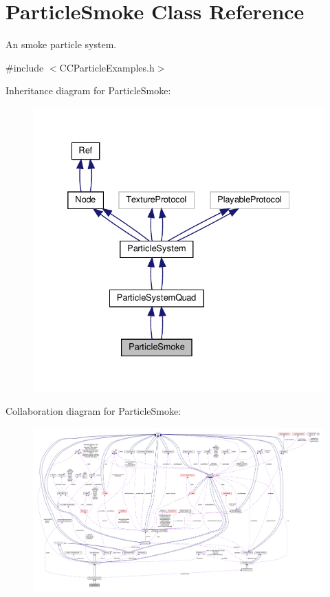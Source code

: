 \hypertarget{classParticleSmoke}{}\section{Particle\+Smoke Class Reference}
\label{classParticleSmoke}


An smoke particle system.  




{\ttfamily \#include $<$C\+C\+Particle\+Examples.\+h$>$}



Inheritance diagram for Particle\+Smoke\+:
\nopagebreak
\begin{figure}[H]
\begin{center}
\leavevmode
\includegraphics[width=332pt]{classParticleSmoke__inherit__graph}
\end{center}
\end{figure}


Collaboration diagram for Particle\+Smoke\+:
\nopagebreak
\begin{figure}[H]
\begin{center}
\leavevmode
\includegraphics[width=350pt]{classParticleSmoke__coll__graph}
\end{center}
\end{figure}
